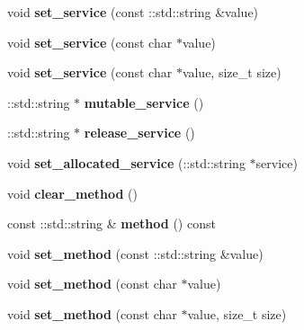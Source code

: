 \begin{DoxyCompactItemize}
void {\bfseries set\+\_\+service} (const \+::std\+::string \&value)
\item 
\mbox{\label{classcoappbrpc_1_1Request_a36bacf2f08ded736916657c94b14fc60}} 
void {\bfseries set\+\_\+service} (const char $\ast$value)
\item 
\mbox{\label{classcoappbrpc_1_1Request_aa59b8a2db7fcf08849232a23d90260d0}} 
void {\bfseries set\+\_\+service} (const char $\ast$value, size\+\_\+t size)
\item 
\mbox{\label{classcoappbrpc_1_1Request_a9fb0e2a179f69ad34a07025789a000d5}} 
\+::std\+::string $\ast$ {\bfseries mutable\+\_\+service} ()
\item 
\mbox{\label{classcoappbrpc_1_1Request_ad24c1c227bf3b8bd1c2ee60c3617eb7c}} 
\+::std\+::string $\ast$ {\bfseries release\+\_\+service} ()
\item 
\mbox{\label{classcoappbrpc_1_1Request_a59e8d08d63e9f91ea83cad31d73ae7e6}} 
void {\bfseries set\+\_\+allocated\+\_\+service} (\+::std\+::string $\ast$service)
\item 
\mbox{\label{classcoappbrpc_1_1Request_a0bf017c8c04f9ba6c9008d56ea417e70}} 
void {\bfseries clear\+\_\+method} ()
\item 
\mbox{\label{classcoappbrpc_1_1Request_a0fd5b103c1ce2681040a80f88fdb8b37}} 
const \+::std\+::string \& {\bfseries method} () const
\item 
\mbox{\label{classcoappbrpc_1_1Request_abce4c7d94de659fe0b1078907fade489}} 
void {\bfseries set\+\_\+method} (const \+::std\+::string \&value)
\item 
\mbox{\label{classcoappbrpc_1_1Request_a578f6f991711590b9c55e17581f8561c}} 
void {\bfseries set\+\_\+method} (const char $\ast$value)
\item 
\mbox{\label{classcoappbrpc_1_1Request_abb7aa04c7773dedb82e60d5569f3aa78}} 
void {\bfseries set\+\_\+method} (const char $\ast$value, size\+\_\+t size)

\end{DoxyCompactItemize}
